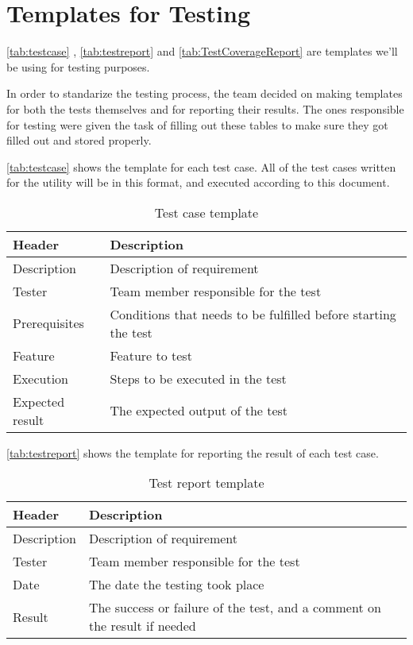 \section{Templates for Testing}
\autoref{tab:testcase} , \autoref{tab:testreport} and \autoref{tab:TestCoverageReport} are templates we'll be
using for testing purposes.

In order to standarize the testing process, the team decided on making templates for both the tests themselves and for reporting their results. The ones responsible for testing were given the task of filling out these tables to make sure they got filled out and stored properly.

\autoref{tab:testcase} shows the template for each test case. All of the test cases written for the \gls{utility} will be in this format, and executed according to this document.

\begin{table}[htb] \small \center
\caption{Test case template \label{tab:testcase}}
\begin{tabular}{l l}
	\toprule
	Header & Description \\
	\midrule
	Description & Description of requirement \\
	Tester & Team member responsible for the test \\
	Prerequisites & Conditions that needs to be fulfilled before starting the test \\
	Feature & Feature to test \\
	Execution & Steps to be executed in the test \\
	Expected result & The expected output of the test \\
	\bottomrule
\end{tabular}
\end{table}

\autoref{tab:testreport} shows the template for reporting the result of each test case.

\begin{table}[htb] \small \center
\caption{Test report template \label{tab:testreport}}
\begin{tabular}{l l}
	\toprule
	Header & Description \\
	\midrule
	Description & Description of requirement \\
	Tester & Team member responsible for the test \\
	Date & The date the testing took place \\
	Result & The success or failure of the test, and a comment on the result if needed \\
	\bottomrule
\end{tabular}
\end{table}

